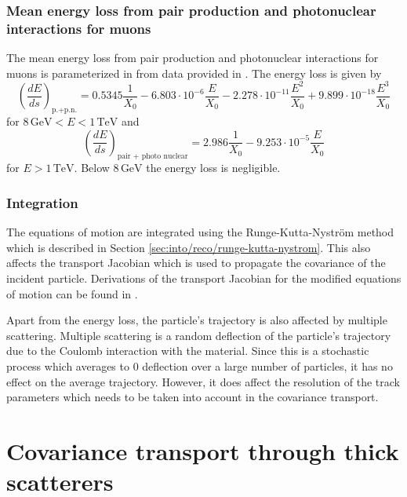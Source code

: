 \subsubsection{Mean energy loss from pair production and photonuclear interactions for muons}

The mean energy loss from pair production and photonuclear interactions for muons is parameterized in \textcite{pub-2008-003} from data provided in \textcite{GROOM2001183}. The energy loss is given by
\begin{equation}
    \left( \frac{dE}{ds} \right)_{\text{p.+p.n.}} = 0.5345 \frac{1}{X_0} - 6.803 \cdot 10^{-6} \frac{E}{X_0} - 2.278 \cdot 10^{-11} \frac{E^2}{X_0} + 9.899 \cdot 10^{-18} \frac{E^3}{X_0}
\end{equation}
for $8 \, \text{GeV} < E < 1 \, \text{TeV}$ and
\begin{equation}
    \left( \frac{dE}{ds} \right)_{\text{pair + photo nuclear}} = 2.986 \frac{1}{X_0} - 9.253 \cdot 10^{-5} \frac{E}{X_0}
\end{equation}
for $E > 1 \, \text{TeV}$. Below $8 \, \text{GeV}$ the energy loss is negligible.

\subsubsection{Integration}

The equations of motion are integrated using the Runge-Kutta-Nyström method which is described in Section \ref{sec:into/reco/runge-kutta-nystrom}. This also affects the transport Jacobian which is used to propagate the covariance of the incident particle. Derivations of the transport Jacobian for the modified equations of motion can be found in \textcite{pub-2009-002}.

Apart from the energy loss, the particle's trajectory is also affected by multiple scattering. Multiple scattering is a random deflection of the particle's trajectory due to the Coulomb interaction with the material. Since this is a stochastic process which averages to 0 deflection over a large number of particles, it has no effect on the average trajectory. However, it does affect the resolution of the track parameters which needs to be taken into account in the covariance transport.

\section{Covariance transport through thick scatterers}

